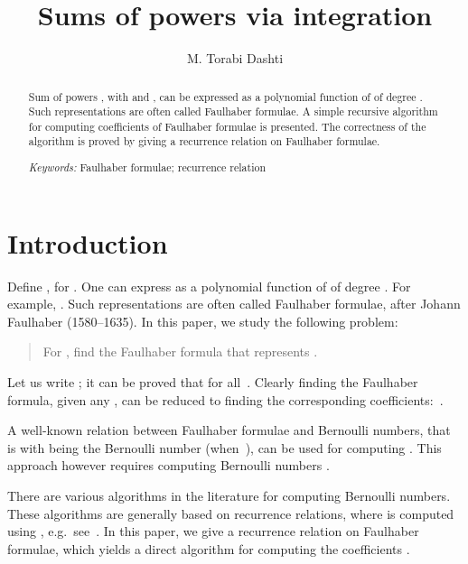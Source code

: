 \documentclass[a4paper,10pt]{amsart}
\theoremstyle{remark}
\begin{document}
\title{{\bf Sums of powers via integration}}

\author{M. Torabi Dashti}
\address{M. Torabi Dashti, Dept. Computer Science, ETH Z{\"u}rich, Switzerland.}



\begin{abstract}
Sum of powers , with  and , can be
expressed as a polynomial function of  of degree .  Such
representations are often called Faulhaber formulae. A simple
recursive algorithm for computing coefficients of Faulhaber formulae
is presented. The correctness of the algorithm is proved by giving a
recurrence relation on Faulhaber formulae.

\bigskip

\noindent
\emph{Keywords:} Faulhaber formulae; recurrence relation
\end{abstract}

\maketitle

\section{Introduction}
\label{sec:intro}
Define , for . One can
express  as a polynomial function of  of degree . For
example,
. Such
representations are often called Faulhaber formulae, after Johann
Faulhaber (1580--1635). In this paper, we study the following problem:

\vspace{0.5ex}
\begin{quote}
For , find the Faulhaber
formula that represents .
\end{quote}
\vspace{0.5ex}

Let us write ; it can
be proved that  for all~. Clearly finding the
Faulhaber formula, given any , can be reduced to finding the
corresponding coefficients:~.


A well-known relation between Faulhaber formulae and Bernoulli
numbers, that is  with  being the
 Bernoulli number (when~),
can be used for computing . This approach however
requires computing Bernoulli numbers .

There are various algorithms in the literature for computing Bernoulli
numbers.  These algorithms are generally based on recurrence
relations, where  is computed using , e.g.\ see~\cite{kb,ad}.  In this paper, we
give a recurrence relation on Faulhaber formulae, which yields a
direct algorithm for computing the coefficients .
\end{document}
